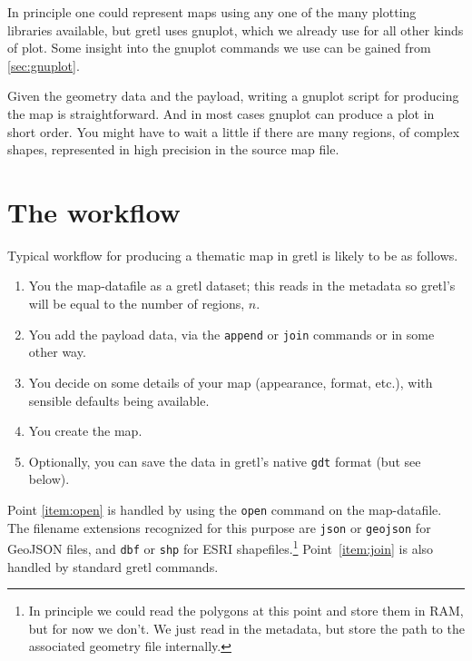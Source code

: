 \documentclass{article}
\begin{document}
In principle one could represent maps using any one of the many
plotting libraries available, but gretl uses \textsf{gnuplot}, which
we already use for all other kinds of plot. Some insight into the
\textsf{gnuplot} commands we use can be gained from \ref{sec:gnuplot}.

Given the geometry data and the payload, writing a \textsf{gnuplot}
script for producing the map is straightforward. And in most cases
\textsf{gnuplot} can produce a plot in short order. You might have to
wait a little if there are many regions, of complex shapes,
represented in high precision in the source map file.

\section{The workflow}
\label{sec:workflow}

Typical workflow for producing a thematic map in gretl is likely to be
as follows.

\begin{enumerate}
\item You  the map-datafile as a gretl dataset; this reads
  in the metadata so gretl's  will be equal to the number
  of regions, $n$.\label{item:open}
\item You add the payload data, via the \texttt{append} or
  \texttt{join} commands or in some other way.\label{item:join}
\item You decide on some details of your map (appearance, format,
  etc.), with sensible defaults being available.\label{item:look}
\item You create the map.\label{item:map}
\item Optionally, you can save the data in gretl's native \texttt{gdt}
  format (but see below).\label{item:save}
\end{enumerate}

Point \ref{item:open} is handled by using the \texttt{open} command on
the map-datafile. The filename extensions recognized for this purpose
are \texttt{json} or \texttt{geojson} for GeoJSON files, and
\texttt{dbf} or \texttt{shp} for ESRI shapefiles.\footnote{In
  principle we could read the polygons at this point and store them in
  RAM, but for now we don't. We just read in the metadata, but store
  the path to the associated geometry file internally.}
Point~\ref{item:join} is also handled by standard gretl commands.
\end{document}
